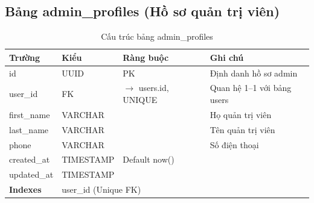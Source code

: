 \documentclass[12pt,a4paper]{article}
\begin{document}
\subsection{Bảng admin\_profiles (Hồ sơ quản trị viên)}
\begin{longtable}{|l|l|l|p{5.5cm}|}
    \caption{Cấu trúc bảng admin\_profiles}                                                                                     \\
    \hline
    \rowcolor{headerblue}
    \textbf{Trường}  & \textbf{Kiểu}                             & \textbf{Ràng buộc}             & \textbf{Ghi chú}            \\
    \hline
    id               & UUID                                      & PK                             & Định danh hồ sơ admin       \\
    \hline
    user\_id         & FK                                        & $\rightarrow$ users.id, UNIQUE & Quan hệ 1--1 với bảng users \\
    \hline
    first\_name      & VARCHAR                                   &                                & Họ quản trị viên            \\
    \hline
    last\_name       & VARCHAR                                   &                                & Tên quản trị viên           \\
    \hline
    phone            & VARCHAR                                   &                                & Số điện thoại               \\
    \hline
    created\_at      & TIMESTAMP                                 & Default now()                  &                             \\
    \hline
    updated\_at      & TIMESTAMP                                 &                                &                             \\
    \hline
    \rowcolor{headerblue}
    \textbf{Indexes} & \multicolumn{3}{l|}{user\_id (Unique FK)}                                                                \\
    \hline
\end{longtable}
\end{document}
